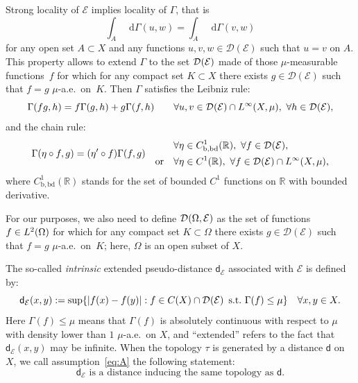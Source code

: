\documentclass[10pt]{amsart}
\let\sep:
\newcommand{\NoChangel}[1]{%
\expandafter\let\csname old\string#1\endcsname=#1
\let#1=\relax
\newcommand{#1}{\mathcode`l="716C\csname old\string#1\endcsname\mathcode`l="7160 }%
}
\theoremstyle{plain}
\theoremstyle{definition}
\newcommand{\setR}{\mathbb{R}}
\newcommand{\cE}{\mathcal{E}}
\newcommand{\cD}{\mathcal{D}}
\newcommand{\di}{\mathop{}\!\mathrm{d}}
\newcommand{\loc}{\mathrm{loc}}\NoChangel{\loc}
\newcommand{\dist}{\mathsf{d}}
\begin{document}
Strong locality of $\cE$ implies locality of $\Gamma$, that is
\[
\int_A \di \Gamma(u,w) = \int_A \di \Gamma(v,w)
\]
for any open set $A\subset X$ and any functions $u,v,w \in \cD(\cE)$ such that $u=v$ on $A$. This property allows to extend $\Gamma$ to the set $\cD_{\loc}(\cE)$ made of those $\mu$-measurable functions~$f$ for which for any compact set $K\subset X$ there exists $g \in \cD(\cE)$ such that $f=g$ $\mu$-a.e.\ on~$K$. Then $\Gamma$ satisfies the Leibniz rule:
\begin{equation}\label{eq:Leibniz}
\Gamma(fg,h)=f \Gamma(g,h) + g \Gamma(f,h) \qquad \forall u,v \in \cD_{\loc}(\cE) \cap L^{\infty}_{\loc}(X,\mu), \, \, \forall h \in \cD_{\loc}(\cE),
\end{equation}
and the chain rule:
\begin{equation}
\Gamma(\eta \circ f,g)=(\eta'\circ f) \Gamma(f,g)\quad
\begin{aligned}\label{eq:chain}
& \forall \eta \in C^1_\mathrm{b,bd}(\setR), \, \, \forall f \in \cD_{\loc}(\cE), \\
\text{or} \quad & \forall \eta \in C^1(\setR), \, \, \forall f \in \cD_{\loc}(\cE)\cap L^{\infty}(X,\mu),
\end{aligned}
\end{equation}
where $C^1_\mathrm{b,bd}(\setR)$ stands for the set of bounded $C^1$ functions on $\setR$ with bounded derivative.

For our purposes, we also need to define $\cD_{\loc}(\Omega,\cE)$ as the set of functions $f\in L^2_{\loc}(\Omega)$ for which for any compact set $K\subset \Omega$ there exists $g \in \cD(\cE)$ such that $f=g$ $\mu$-a.e.\ on~$K$; here, $\Omega$ is an open subset of $X$.

The so-called \textit{intrinsic} extended pseudo-distance $\dist_\cE$ associated with $\cE$ is defined by:
\begin{equation}\label{eq:defdist}
\dist_\cE(x,y):=\sup \{|f(x)-f(y)| \sep f \in C(X) \cap \cD_{\loc}(\cE) \, \, \, \text{s.t.} \, \, \Gamma(f) \le \mu\}\quad \forall x,y \in X.
\end{equation}
Here $\Gamma(f) \le \mu$ means that $\Gamma(f)$ is absolutely continuous with respect to $\mu$ with density lower than $1$ $\mu$-a.e.\ on $X$, and ``extended'' refers to the fact that $\dist_\cE(x,y)$ may be infinite. When the topology $\tau$ is generated by a distance $\dist$ on $X$, we call assumption~\eqref{eq:A} the following statement:
\begin{equation}\label{eq:A}\tag{A}
\text{$\dist_\cE$ is a distance inducing the same topology as $\dist$}.
\end{equation}
\end{document}
